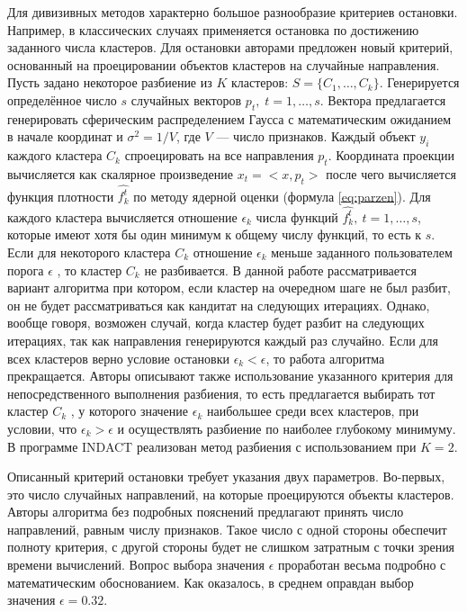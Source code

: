 \documentclass[12pt]{diploma}
\begin{document}
	Для дивизивных методов характерно большое разнообразие критериев остановки. Например, в классических случаях применяется остановка по достижению заданного числа кластеров. Для остановки \BiKMR  авторами предложен новый критерий, основанный на проецировании объектов кластеров на случайные направления. Пусть задано некоторое разбиение из $ K $ кластеров: $ S = \{C_1,\ldots,C_k\} $. Генерируется определённое число $ s $ случайных векторов $ p_t,\;t=1,\ldots,s $. Вектора предлагается генерировать сферическим распределением Гаусса с математическим ожиданием в начале координат и $ \sigma^2 = 1/V $, где $ V $ --- число признаков. Каждый объект $ y_i $ каждого кластера $ C_k $ спроецировать на все направления $ p_t $. Координата проекции вычисляется как скалярное произведение $ x_t = <x,p_t> $ после чего вычисляется функция плотности $ \hat{f_k^t} $ по методу ядерной оценки (формула \eqref{eq:parzen}). Для каждого кластера вычисляется отношение $ \epsilon_k $ числа функций $ \hat{f_k^t},\:t=1,\ldots,s $, которые имеют хотя бы один минимум к общему числу функций, то есть к $ s $. Если для некоторого кластера $ C_k $ отношение $ \epsilon_k $ меньше заданного пользователем порога $ \epsilon $ , то кластер $ C_k $ не разбивается. В данной работе рассматривается вариант алгоритма при котором, если кластер на очередном шаге не был разбит, он не будет рассматриваться как кандитат на следующих итерациях. Однако, вообще говоря, возможен случай, когда кластер будет разбит на следующих итерациях, так как направления генерируются каждый раз случайно. Если для всех кластеров верно условие остановки $ \epsilon_k<\epsilon $, то работа алгоритма прекращается. Авторы \cite{kovaleva} описывают также использование указанного критерия для непосредственного выполнения разбиения, то есть предлагается выбирать тот кластер $ C_k $ , у которого значение $ \epsilon_k $ наибольшее среди всех кластеров, при условии, что $ \epsilon_k > \epsilon $ и осуществлять разбиение по наиболее глубокому минимуму. В программе INDACT реализован метод разбиения с использованием \kmeans при $ K=2 $.
	
	Описанный критерий остановки требует указания двух параметров. Во-первых, это число случайных направлений, на которые проецируются объекты кластеров. Авторы алгоритма без подробных пояснений предлагают принять число направлений, равным числу признаков. Такое число с одной стороны обеспечит полноту критерия, с другой стороны будет не слишком затратным с точки зрения времени вычислений. Вопрос выбора значения $ \epsilon  $ проработан весьма подробно с  математическим обоснованием. Как оказалось, в среднем оправдан выбор значения $ \epsilon=0.32 $.
	
\end{document}
